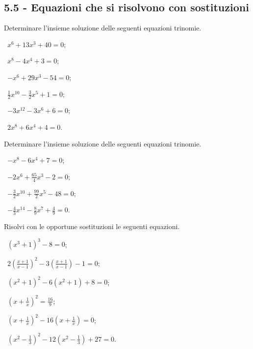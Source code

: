 \subsection*{5.5 - Equazioni che si risolvono con sostituzioni}

\begin{esercizio}[\Ast]
 \label{ese:5.30}
Determinare l'insieme soluzione delle seguenti equazioni trinomie.
\begin{multicols}{2}
 \begin{enumeratea}
 \item~$x^6+13x^3+40=0$;
 \item~$x^8-4x^4+3=0$;
 \item~$-x^6+29x^3-54=0$;
 \item~$\frac 1 2x^{10}-\frac 3 2x^5+1=0$;
 \item~$-3x^{12}-3x^6+6=0$;
 \item~$2x^8+6x^4+4=0$.
 \end{enumeratea}
\end{multicols}
\end{esercizio}
\pagebreak

\begin{esercizio}[\Ast]
 \label{ese:5.31}
Determinare l'insieme soluzione delle seguenti equazioni trinomie.
\begin{multicols}{2}
 \begin{enumeratea}
 \item~$-x^8-6x^4+7=0$;
 \item~$-2x^6+\frac{65} 4x^3-2=0$;
 \item~$-\frac 3 2x^{10}+\frac{99} 2x^5-48=0$;
 \item~$-\frac 4 3x^{14}-\frac 8 9x^7+\frac 4 9=0$.
 \end{enumeratea}
\end{multicols}
\end{esercizio}

\begin{esercizio}[\Ast]
 \label{ese:5.32}
Risolvi con le opportune sostituzioni le seguenti equazioni.
\begin{multicols}{2}
 \begin{enumeratea}
 \item~$\left(x^3+1\right)^3-8=0$;
 \item~$2\left(\frac{x+1}{x-1}\right)^2-3\left(\frac{x+1}{x-1}\right)-1=0$;
 \item~$\left(x^2+1\right)^2-6\left(x^2+1\right)+8=0$;
 \item~$\left(x+\frac 1 x\right)^2=\frac{16} 9$;
 \item~$\left(x+\frac 1 x\right)^2-16\left(x+\frac 1 x\right)=0$;
 \item~$\left(x^2-\frac 1 3\right)^2-12\left(x^2-\frac 1 3\right)+27=0$.
 \end{enumeratea}
\end{multicols}
\end{esercizio}

